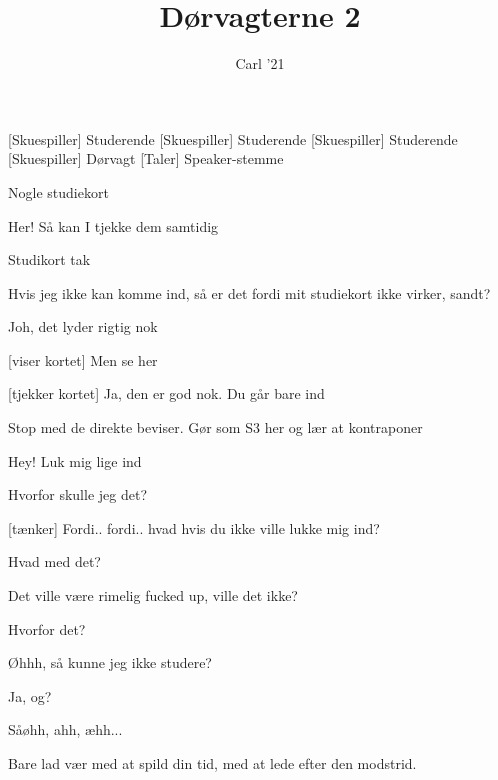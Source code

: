 \documentclass[a4paper,11pt]{article}
\title{Dørvagterne 2}
\author{Carl '21}
\begin{document}
\maketitle

\begin{roles}
[Skuespiller] Studerende
[Skuespiller] Studerende
[Skuespiller] Studerende
[Skuespiller] Dørvagt
[Taler] Speaker-stemme
\end{roles}

\begin{props}
\item Nogle studiekort
\end{props}


\begin{sketch}

 Her! Så kan I tjekke dem samtidig


 Studikort tak

 Hvis jeg ikke kan komme ind, så er det fordi mit studiekort ikke virker, sandt?

 Joh, det lyder rigtig nok

[viser kortet] Men se her

[tjekker kortet] Ja, den er god nok. Du går bare ind



 Stop med de direkte beviser. Gør som S3 her og lær at kontraponer





 Hey! Luk mig lige ind

 Hvorfor skulle jeg det?

[tænker] Fordi.. fordi.. hvad hvis du ikke ville lukke mig ind?

 Hvad med det?

 Det ville være rimelig fucked up, ville det ikke?

 Hvorfor det?

 Øhhh, så kunne jeg ikke studere?

 Ja, og?

 Såøhh, ahh, æhh...


 Bare lad vær med at spild din tid, med at lede efter den modstrid.



\end{sketch}
\end{document}
